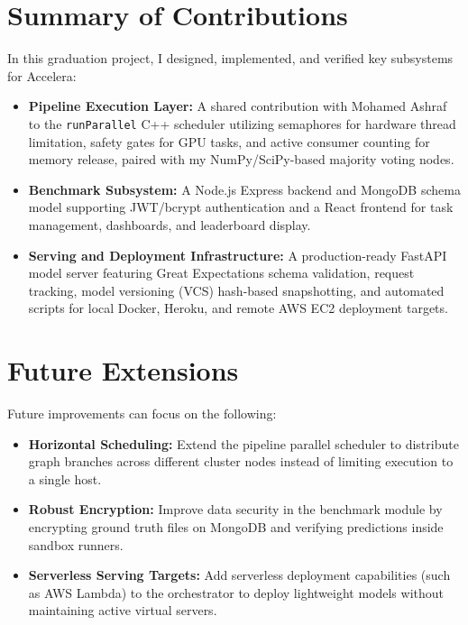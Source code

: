 \documentclass[12pt,a4paper,oneside]{report}
\newcommand{\systemname}{Accelera}
\newcommand{\modulepath}[1]{\texttt{#1}}
\begin{document}
\section{Summary of Contributions}
In this graduation project, I designed, implemented, and verified key subsystems for \systemname{}:
\begin{itemize}[leftmargin=*]
    \item \textbf{Pipeline Execution Layer:} A shared contribution with Mohamed Ashraf to the \modulepath{runParallel} C++ scheduler utilizing semaphores for hardware thread limitation, safety gates for GPU tasks, and active consumer counting for memory release, paired with my NumPy/SciPy-based majority voting nodes.
    \item \textbf{Benchmark Subsystem:} A Node.js Express backend and MongoDB schema model supporting JWT/bcrypt authentication and a React frontend for task management, dashboards, and leaderboard display.
    \item \textbf{Serving and Deployment Infrastructure:} A production-ready FastAPI model server featuring Great Expectations schema validation, request tracking, model versioning (VCS) hash-based snapshotting, and automated scripts for local Docker, Heroku, and remote AWS EC2 deployment targets.
\end{itemize}

\section{Future Extensions}
Future improvements can focus on the following:
\begin{itemize}[leftmargin=*]
    \item \textbf{Horizontal Scheduling:} Extend the pipeline parallel scheduler to distribute graph branches across different cluster nodes instead of limiting execution to a single host.
    \item \textbf{Robust Encryption:} Improve data security in the benchmark module by encrypting ground truth files on MongoDB and verifying predictions inside sandbox runners.
    \item \textbf{Serverless Serving Targets:} Add serverless deployment capabilities (such as AWS Lambda) to the orchestrator to deploy lightweight models without maintaining active virtual servers.
\end{itemize}
\end{document}
